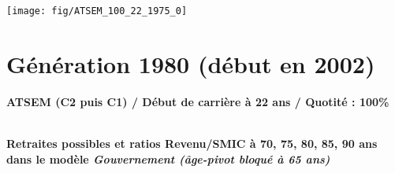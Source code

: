  \vspace{0.1cm} 

 {\hspace{-2.2cm}\texttt{[image: fig/ATSEM\_100\_22\_1975\_0]}} 

\newpage 
 
\section{Génération 1980 (début en 2002)\label{ATSEM_100_22_1980_0}} 
 
{\bf \noindent ATSEM (C2 puis C1) / Début de carrière à 22 ans / Quotité : 100\%}  ~ 

 ~\\{\bf \noindent Retraites possibles et ratios Revenu/SMIC à 70, 75, 80, 85, 90 ans dans le modèle \emph{Gouvernement (âge-pivot bloqué à 65 ans)}}  
 
